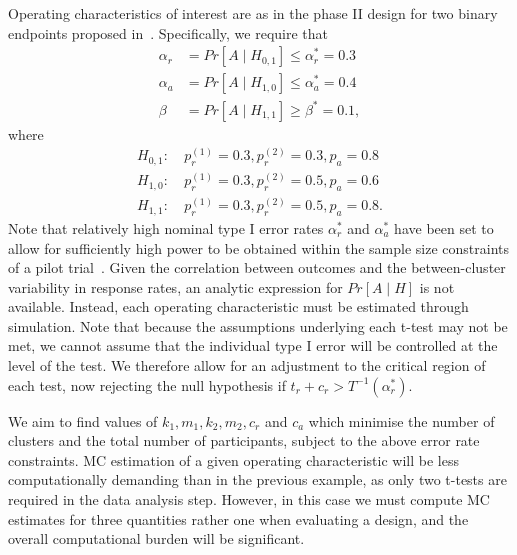 \documentclass{article} %
\begin{document}
Operating characteristics of interest are as in the phase II design for two binary endpoints proposed in~\cite{Bryant1995}. Specifically, we require that
\begin{align}
\alpha_{r} &= Pr[A \mid H_{0,1}] \leq \alpha_{r}^{*} = 0.3 \\
\alpha_{a} &= Pr[A \mid H_{1,0}] \leq \alpha_{a}^{*} = 0.4 \\
\beta &= Pr[A \mid H_{1,1}] \geq \beta^{*} = 0.1,
\end{align}
where
\begin{align}
H_{0,1}:& ~p_{r}^{(1)} = 0.3, p_{r}^{(2)} = 0.3, p_{a} = 0.8 \\
H_{1,0}:& ~p_{r}^{(1)} = 0.3, p_{r}^{(2)} = 0.5, p_{a} = 0.6 \\
H_{1,1}:& ~p_{r}^{(1)} = 0.3, p_{r}^{(2)} = 0.5, p_{a} = 0.8.
\end{align}
Note that relatively high nominal type I error rates $\alpha_{r}^{*}$ and $\alpha_{a}^{*}$ have been set to allow for sufficiently high power to be obtained within the sample size constraints of a pilot trial~\cite{Lee2014}. Given the correlation between outcomes and the between-cluster variability in response rates, an analytic expression for $Pr[A \mid H]$ is not available. Instead, each operating characteristic must be estimated through simulation. Note that because the assumptions underlying each t-test may not be met, we cannot assume that the individual type I error will be controlled at the level of the test. We therefore allow for an adjustment to the critical region of each test, now rejecting the null hypothesis if $t_{r} + c_{r} > T^{-1}(\alpha_{r}^{*})$. 

We aim to find values of $k_{1}, m_{1}, k_{2}, m_{2}, c_{r}$ and $c_{a}$ which minimise the number of clusters and the total number of participants, subject to the above error rate constraints. MC estimation of a given operating characteristic will be less computationally demanding than in the previous example, as only two t-tests are required in the data analysis step. However, in this case we must compute MC estimates for three quantities rather one when evaluating a design, and the overall computational burden will be significant.


\end{document}
